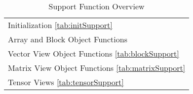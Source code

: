 \begin{table}[H]
\hypertarget{vsiplAPISupport}{}
\caption{Support Function Overview}
\label{tab:vsiplAPISupport}
\begin{center}
\begin{tabular}{l}
Initialization \ref{tab:initSupport}\\
Array and Block Object Functions \\
Vector View Object Functions \ref{tab:blockSupport}\\
Matrix View Object Functions \ref{tab:matrixSupport}\\
Tensor Views \ref{tab:tensorSupport}\\
\end{tabular}
\end{center}
\label{default}
\end{table}%